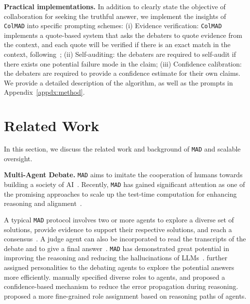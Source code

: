 \documentclass{article} %
\newcommand{\ours}[0]{\texttt{ColMAD}\xspace}
\newcommand{\mad}[0]{\texttt{MAD}\xspace}
\begin{document}
\textbf{Practical implementations.} In addition to clearly state the objective of collaboration for seeking the truthful answer, we implement the insights of \ours into specific prompting schemes: (i) Evidence verification: \ours implements a quote-based system that asks the debaters to quote evidence from the context, and each quote will be verified if there is an exact match in the context, following~\citet{kenton2024on}; (ii) Self-auditing: the debaters are required to self-audit if there exists one potential failure mode in the claim; (iii) Confidence calibration: the debaters are required to provide a confidence estimate for their own claims. 
We provide a detailed description of the algorithm, as well as the prompts in Appendix~\ref{appdx:method}.
%





\section{Related Work}
\label{sec:related}
In this section, we discuss the related work and background of \mad and scalable oversight.

\textbf{Multi-Agent Debate.} 
\mad aims to imitate the cooperation of humans towards building a society of AI~\citep{Minsky1987TheSO}. Recently, \mad has gained significant attention as one of the promising approaches to scale up the test-time computation for enhancing reasoning and alignment~\citep{ai_safety_debate,du2023improving,khan2024debating,kenton2024on}.

A typical \mad protocol involves two or more agents to explore a diverse set of solutions, provide evidence to support their respective solutions, and reach a consensus~\citep{du2023improving}.
A judge agent can also be incorporated to read the transcripts of the debate and to give a final answer~\citep{khan2024debating}. \mad has demonstrated great potential in improving the reasoning and reducing the hallucinations of LLMs~\citep{du2023improving,liang2023encouraging,yin-etal-2023-exchange,chen-etal-2024-comm}.
\citet{liang2023encouraging} further assigned personalities to the debating agents to explore the potential answers more efficiently.
\citet{yin-etal-2023-exchange} manually specified diverse roles to agents, and proposed a confidence-based mechanism to reduce the error propagation during reasoning.
\citet{chen-etal-2024-comm} proposed a more fine-grained role assignment based on reasoning paths of agents.
\end{document}
